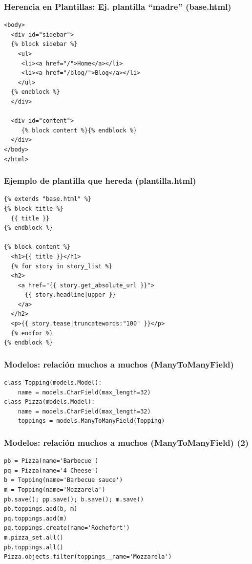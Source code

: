 \begin{frame}[fragile]
\frametitle{Herencia en Plantillas: Ej. plantilla ``madre'' (base.html)}

\begin{verbatim}
<body>
  <div id="sidebar">
  {% block sidebar %}
    <ul>
     <li><a href="/">Home</a></li>
     <li><a href="/blog/">Blog</a></li>
    </ul>
  {% endblock %}
  </div>

  <div id="content">
     {% block content %}{% endblock %}
  </div>
</body>
</html>
\end{verbatim}

\end{frame}


\begin{frame}[fragile]
\frametitle{Ejemplo de plantilla que hereda (plantilla.html)}

\begin{verbatim}
{% extends "base.html" %}
{% block title %}
  {{ title }}
{% endblock %}

{% block content %}
  <h1>{{ title }}</h1>
  {% for story in story_list %}
  <h2>
    <a href="{{ story.get_absolute_url }}">
      {{ story.headline|upper }}
    </a>
  </h2>
  <p>{{ story.tease|truncatewords:"100" }}</p>
  {% endfor %}
{% endblock %}
\end{verbatim}

\end{frame}



\begin{frame}[fragile]
\frametitle{Modelos: relación muchos a muchos (ManyToManyField)}

\begin{verbatim}
class Topping(models.Model):
    name = models.CharField(max_length=32)
class Pizza(models.Model):
    name = models.CharField(max_length=32)
    toppings = models.ManyToManyField(Topping)
\end{verbatim}

\end{frame}


\begin{frame}[fragile]
\frametitle{Modelos: relación muchos a muchos (ManyToManyField) (2)}

\begin{verbatim}
pb = Pizza(name='Barbecue')
pq = Pizza(name='4 Cheese')
b = Topping(name='Barbecue sauce')
m = Topping(name='Mozzarela')
pb.save(); pp.save(); b.save(); m.save()
pb.toppings.add(b, m)
pq.toppings.add(m)
pq.toppings.create(name='Rochefort')
m.pizza_set.all()
pb.toppings.all()
Pizza.objects.filter(toppings__name='Mozzarela')
\end{verbatim}

\end{frame}



